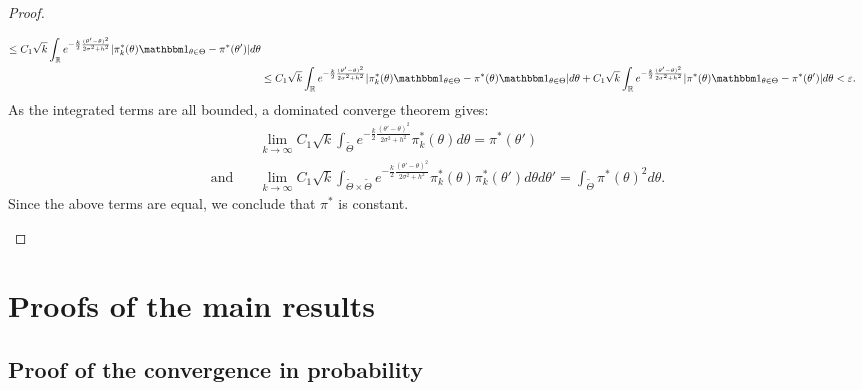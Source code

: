 \begin{proof}
\begin{enumerate}
\begin{equation}
\begin{aligned}
        \leq C_1\sqrt{k}\int_{\RR}e^{-\frac{k}{2}\frac{(\theta'-\theta)^2}{2\sigma^2+h^2}} |\pi^\ast_k(\theta)\indic_{\theta\in\Theta} - \pi^\ast(\theta') |d\theta \\
        &\leq  C_1\sqrt{k}\int_{\RR}e^{-\frac{k}{2}\frac{(\theta'-\theta)^2}{2\sigma^2+h^2}} |\pi^\ast_k(\theta)\indic_{\theta\in\Theta} - \pi^\ast(\theta)\indic_{\theta\in\Theta} |d\theta 
            + C_1\sqrt{k}\int_{\RR}e^{-\frac{k}{2}\frac{(\theta'-\theta)^2}{2\sigma^2+h^2}} |\pi^\ast(\theta)\indic_{\theta\in\Theta} - \pi^\ast(\theta') |d\theta <\eps.\\
        \end{aligned}
        \end{equation}
        As the integrated terms are all bounded, a dominated converge theorem gives:
        \begin{equation}
            \begin{aligned}
            &\lim_{k\rightarrow\infty}C_1\sqrt{k}\int_{\tilde\Theta} e^{-\frac{k}{2}\frac{(\theta'-\theta)^2}{2\sigma^2+h^2}} \pi_k^\ast(\theta)d\theta = \pi^\ast(\theta')\\
            \text{and}\quad&
            \lim_{k\rightarrow\infty} C_1\sqrt{k}\int_{\tilde\Theta\times\tilde\Theta} e^{-\frac{k}{2}\frac{(\theta'-\theta)^2}{2\sigma^2+h^2}} \pi_k^\ast(\theta)\pi_k^\ast(\theta')d\theta d\theta' = \int_{\tilde\Theta}\pi^\ast(\theta)^2d\theta.
            \end{aligned}
        \end{equation}
        Since the above terms are equal, we conclude that $\pi^\ast$ is constant.





 \end{enumerate}
 


\end{proof}


\section{Proofs of the main results}\label{sec:PSGSA:proofs}

\subsection{Proof of the convergence in probability}


